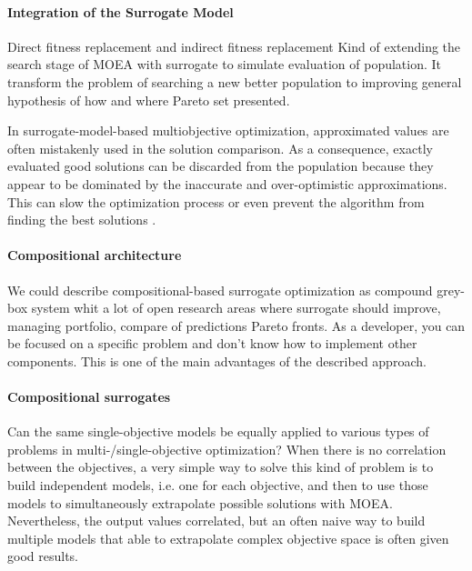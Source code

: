             \paragraph{Integration of the Surrogate Model}
            Direct fitness replacement and indirect fitness replacement
            Kind of extending the search stage of MOEA with surrogate to simulate evaluation of population. It transform the problem of searching a new better population to improving general hypothesis of how and where Pareto set presented.  

            In surrogate-model-based multiobjective optimization, approximated values are often mistakenly used in the solution comparison. As a consequence, exactly evaluated good solutions can be discarded from the population because they appear to be dominated by the inaccurate and over-optimistic approximations. This can slow the optimization process or even prevent the algorithm from finding the best solutions \cite{MlakarPTF15}. 
            
            \paragraph{Compositional architecture}
            We could describe compositional-based surrogate optimization as compound grey-box system whit a lot of open research areas where surrogate should improve, managing portfolio, compare of predictions Pareto fronts. 
            As a developer, you can be focused on a specific problem and don't know how to implement other components. This is one of the main advantages of the described approach.
    
            \paragraph{Compositional surrogates}
            Can the same single-objective models be equally applied to various types of problems in multi-/single-objective optimization?
            When there is no correlation between the objectives, a very simple way to solve this kind of problem is to build independent models, i.e. one for each objective, and then to use those models to simultaneously extrapolate possible solutions with MOEA. Nevertheless, the output values correlated, but an often naive way to build multiple models that able to extrapolate complex objective space is often given good results.  
    
